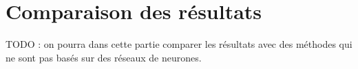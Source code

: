 
\chapter{Comparaison des résultats}




TODO : on pourra dans cette partie comparer les résultats avec des méthodes qui ne sont pas 
basés sur des réseaux de neurones.